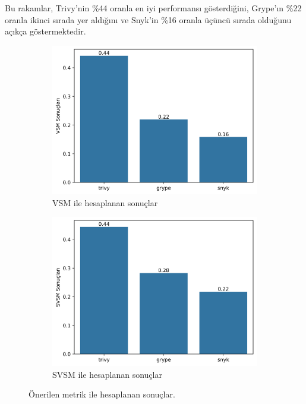 Bu rakamlar, Trivy'nin \%44 oranla en iyi performansı gösterdiğini, Grype'ın \%22 oranla ikinci sırada yer aldığını ve Snyk'in \%16 oranla üçüncü sırada olduğunu açıkça göstermektedir.


\begin{figure}[!htbp]
	\centering
	\begin{subfigure}[]{\linewidth/2}
		\includegraphics[width=\linewidth]{images/s1/VSM.png}
		\caption{VSM ile hesaplanan sonuçlar}\label{fig:vsm}
	\end{subfigure}%
	\begin{subfigure}[]{\linewidth/2}
		\includegraphics[width=\linewidth]{images/s1/SVSM.png}
		\caption{SVSM ile hesaplanan sonuçlar}\label{fig:svms}
	\end{subfigure}

	\caption{Önerilen metrik ile hesaplanan sonuçlar.}\label{fig:proposed-metric-results}
\end{figure}

